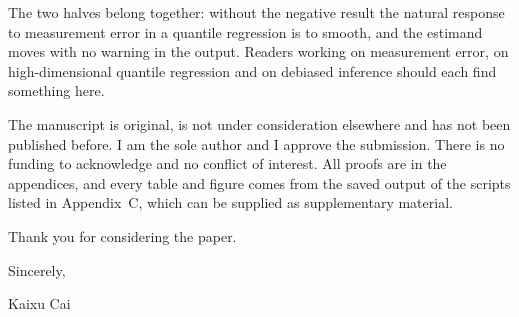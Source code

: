 \documentclass[11pt]{article}
\begin{document}
The two halves belong together: without the negative result the natural response to
measurement error in a quantile regression is to smooth, and the estimand moves with no warning
in the output. Readers working on measurement error, on high-dimensional quantile regression
and on debiased inference should each find something here.

The manuscript is original, is not under consideration elsewhere and has not been published
before. I am the sole author and I approve the submission. There is no funding to acknowledge
and no conflict of interest. All proofs are in the appendices, and every table and figure comes
from the saved output of the scripts listed in Appendix~C, which can be supplied as
supplementary material.

Thank you for considering the paper.

\medskip
Sincerely,

\medskip
Kaixu Cai
\end{document}
